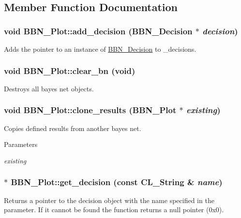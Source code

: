 \subsection{Member Function Documentation}
\hypertarget{classBBN__Plot_a7d7efcce2bd7fa7599f2bf6db57b8bdc}{
\subsubsection[{add\_\-decision}]{\setlength{\rightskip}{0pt plus 5cm}void BBN\_\-Plot::add\_\-decision ({\bf BBN\_\-Decision} $\ast$ {\em decision})}}
\label{classBBN__Plot_a7d7efcce2bd7fa7599f2bf6db57b8bdc}
Adds the pointer to an instance of \hyperlink{classBBN__Decision}{BBN\_\-Decision} to \_\-decisions. \hypertarget{classBBN__Plot_a04269d854d91d36d29f4297915f16e84}{
\subsubsection[{clear\_\-bn}]{\setlength{\rightskip}{0pt plus 5cm}void BBN\_\-Plot::clear\_\-bn (void)}}
\label{classBBN__Plot_a04269d854d91d36d29f4297915f16e84}
Destroys all bayes net objects. \hypertarget{classBBN__Plot_afbaf527d64694381a4e334b312cec999}{
\subsubsection[{clone\_\-results}]{\setlength{\rightskip}{0pt plus 5cm}void BBN\_\-Plot::clone\_\-results ({\bf BBN\_\-Plot} $\ast$ {\em existing})}}
\label{classBBN__Plot_afbaf527d64694381a4e334b312cec999}
Copies defined results from another bayes net.


\begin{DoxyParams}{Parameters}
\item[{\em existing}]\end{DoxyParams}
\hypertarget{classBBN__Plot_a2c1f680d40188bad93cec4474f171329}{
\subsubsection[{get\_\-decision}]{ $\ast$ BBN\_\-Plot::get\_\-decision (const CL\_\-String \& {\em name})}}
\label{classBBN__Plot_a2c1f680d40188bad93cec4474f171329}
Returns a pointer to the decision object with the name specified in the parameter. If it cannot be found the function returns a null pointer (0x0).

